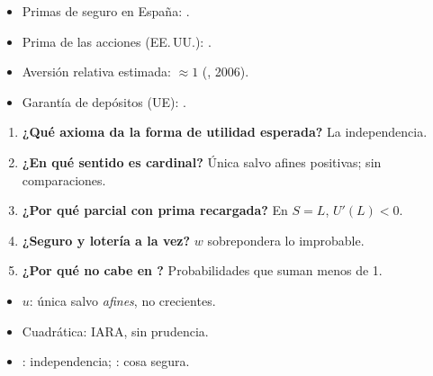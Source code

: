 \documentclass{article}
\begin{document}
\begin{columnas}
\anexorepaso
{}
\begin{itemize}
\item Primas de seguro en España: .
\item Prima de las acciones (EE.\,UU.): .
\item Aversión relativa estimada: $\approx1$ (, 2006).
\item Garantía de depósitos (UE): .
\end{itemize}
\begin{enumerate}
\item \textbf{¿Qué axioma da la forma de utilidad esperada?} La independencia.
\item \textbf{¿En qué sentido es cardinal?} Única salvo afines positivas; sin comparaciones.
\item \textbf{¿Por qué parcial con prima recargada?} En $S=L$, $U'(L)<0$.
\item \textbf{¿Seguro y lotería a la vez?} $w$ sobrepondera lo improbable.
\item \textbf{¿Por qué  no cabe en ?} Probabilidades que suman menos de 1.
\end{enumerate}
\begin{trampa}
\begin{itemize}
\item $u$: única salvo \emph{afines}, no crecientes.
\item Cuadrática: IARA, sin prudencia.
\item {}: independencia; : cosa segura.
\end{itemize}
\end{trampa}

\end{columnas}
\end{document}
